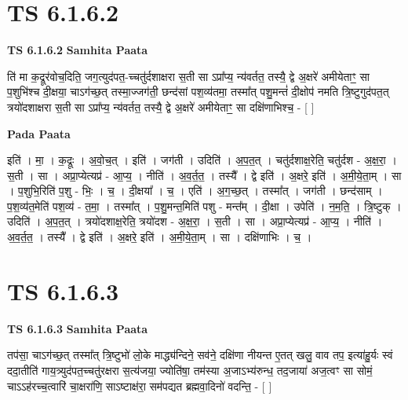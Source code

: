 \documentclass[17pt]{extarticle}
\begin{document}

\section{ TS 6.1.6.2 }

\textbf{TS 6.1.6.2 } \newline
\textbf{Samhita Paata} \newline

ति॑ मा क॒द्रूर॑वोच॒दिति॒ जग॒त्युद॑पत॒-च्चतु॑र्दशाक्षरा स॒ती सा ऽप्रा᳚प्य॒ न्य॑वर्तत॒ तस्यै॒ द्वे अ॒क्षरे॑ अमीयेताꣳ॒॒ सा प॒शुभि॑श्च दी॒क्षया॒ चाऽग॑च्छ॒त् तस्मा॒ज्जग॑ती॒ छन्द॑सां पश॒व्य॑तमा॒ तस्मा᳚त् पशु॒मन्तं॑ दी॒क्षोप॑ नमति त्रि॒ष्टुगुद॑पत॒त् त्रयो॑दशाक्षरा स॒ती सा ऽप्रा᳚प्य॒ न्य॑वर्तत॒ तस्यै॒ द्वे अ॒क्षरे॑ अमीयेताꣳ॒॒ सा दक्षि॑णाभिश्च॒ - [  ] \newline

\textbf{Pada Paata} \newline

इति॑ । मा॒ । क॒द्रूः । अ॒वो॒च॒त् । इति॑ । जग॑ती । उदिति॑ । अ॒प॒त॒त् । चतु॑र्दशाक्ष॒रेति॒ चतु॑र्दश -   अ॒क्ष॒रा॒ । स॒ती । सा । अप्रा॒प्येत्यप्र॑ - आ॒प्य॒ । नीति॑ । अ॒व॒र्त॒त॒ । तस्यै᳚ । द्वे इति॑ । अ॒क्षरे॒ इति॑ । अ॒मी॒ये॒ता॒म् । सा । प॒शुभि॒रिति॑ प॒शु - भिः॒ । च॒ । दी॒क्षया᳚ । च॒ । एति॑ । अ॒ग॒च्छ॒त् । तस्मा᳚त् । जग॑ती । छन्द॑साम् । प॒श॒व्य॑त॒मेति॑ पश॒व्य॑ - त॒मा॒ । तस्मा᳚त् । प॒शु॒मन्त॒मिति॑ पशु - मन्त᳚म् । दी॒क्षा । उपेति॑ । न॒म॒ति॒ । त्रि॒ष्टुक् । उदिति॑ । अ॒प॒त॒त् । त्रयो॑दशाक्ष॒रेति॒ त्रयो॑दश - अ॒क्ष॒रा॒ । स॒ती । सा । अप्रा॒प्येत्यप्र॑ - आ॒प्य॒ । नीति॑ । अ॒व॒र्त॒त॒ । तस्यै᳚ । द्वे इति॑ । अ॒क्षरे॒ इति॑ । अ॒मी॒ये॒ता॒म् । सा । दक्षि॑णाभिः । च॒ ।  \newline





\section{ TS 6.1.6.3 }

\textbf{TS 6.1.6.3 } \newline
\textbf{Samhita Paata} \newline

तप॑सा॒ चाऽग॑च्छ॒त् तस्मा᳚त् त्रि॒ष्टुभो॑ लो॒के माद्ध्य॑न्दिने॒ सव॑ने॒ दक्षि॑णा नीयन्त ए॒तत् खलु॒ वाव तप॒ इत्या॑हु॒र्यः स्वं ददा॒तीति॑ गाय॒त्र्युद॑पत॒च्चतु॑रक्षरा स॒त्य॑जया॒ ज्योति॑षा॒ तम॑स्या अ॒जाऽभ्य॑रुन्ध॒ तद॒जाया॑ अज॒त्वꣳ सा सोमं॒ चाऽऽह॑रच्च॒त्वारि॑ चा॒क्षरा॑णि॒ साऽष्टाक्ष॑रा॒ सम॑पद्यत ब्रह्मवा॒दिनो॑ वदन्ति॒ - [  ] \newline
\end{document}
